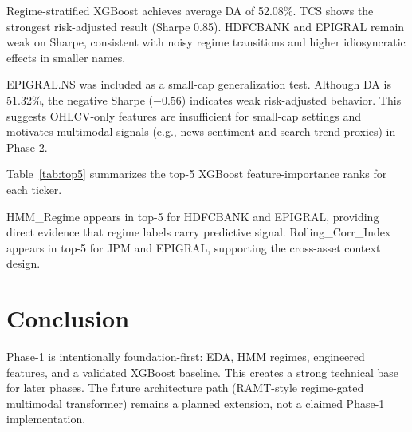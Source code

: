 \documentclass[conference]{IEEEtran}
\begin{document}
Regime-stratified XGBoost achieves average DA of 52.08\%. TCS shows the strongest risk-adjusted result (Sharpe 0.85). HDFCBANK and EPIGRAL remain weak on Sharpe, consistent with noisy regime transitions and higher idiosyncratic effects in smaller names.

EPIGRAL.NS was included as a small-cap generalization test. Although DA is 51.32\%, the negative Sharpe (\(-0.56\)) indicates weak risk-adjusted behavior. This suggests OHLCV-only features are insufficient for small-cap settings and motivates multimodal signals (e.g., news sentiment and search-trend proxies) in Phase-2.

Table~\ref{tab:top5} summarizes the top-5 XGBoost feature-importance ranks for each ticker.

\begin{table}[!t]
\centering
\caption{Top-5 Features per Ticker (XGBoost Importance)}
\label{tab:top5}
\scriptsize
\setlength{\tabcolsep}{2pt}
\renewcommand{\arraystretch}{1.05}
\end{table}

HMM\_Regime appears in top-5 for HDFCBANK and EPIGRAL, providing direct evidence that regime labels carry predictive signal. Rolling\_Corr\_Index appears in top-5 for JPM and EPIGRAL, supporting the cross-asset context design.

\section{Conclusion}
Phase-1 is intentionally foundation-first: EDA, HMM regimes, engineered features, and a validated XGBoost baseline. This creates a strong technical base for later phases. The future architecture path (RAMT-style regime-gated multimodal transformer) remains a planned extension, not a claimed Phase-1 implementation.
\end{document}
